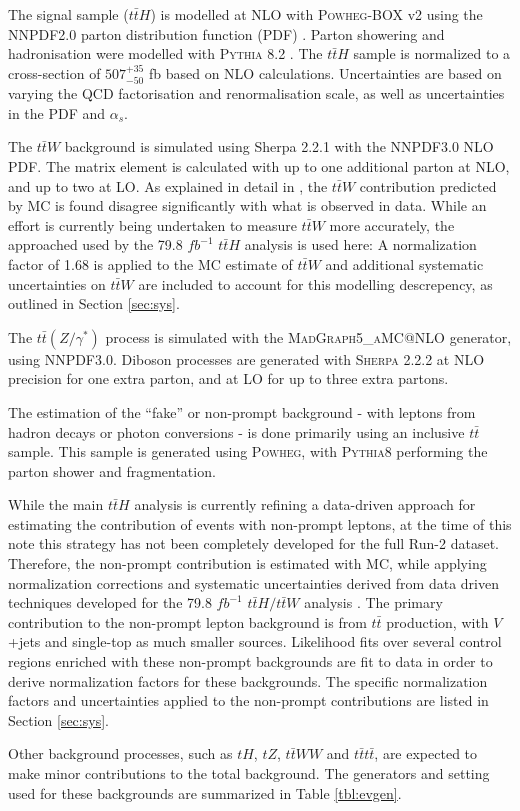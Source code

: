 The signal sample ($t\bar{t}H$) is modelled at NLO with \textsc{Powheg-BOX} v2 using the NNPDF2.0 parton distribution function (PDF) \cite{ATL-PHYS-PUB-2015-011}. Parton showering and hadronisation were modelled with \textsc{Pythia} 8.2 \cite{ATL-PHYS-PUB-2011-009}. The $t\bar{t}H$ sample is normalized to a cross-section of $507^{+35}_{-50}$ fb based on NLO calculations. Uncertainties are based on varying the QCD factorisation and renormalisation scale, as well as uncertainties in the PDF and $\alpha_s$.

The $t\bar{t}W$ background is simulated using Sherpa 2.2.1 with the NNPDF3.0 NLO PDF. The matrix element is calculated with up to one additional parton at NLO, and up to two at LO. As explained in detail in \cite{ttH_paper}, the $t\bar{t}W$ contribution predicted by MC is found disagree significantly with what is observed in data. While an effort is currently being undertaken to measure $t\bar{t}W$ more accurately, the approached used by the 79.8 $fb^{-1}$ $t\bar{t}H$ analysis is used here: A normalization factor of 1.68 is applied to the MC estimate of $t\bar{t}W$ and additional systematic uncertainties on $t\bar{t}W$ are included to account for this modelling descrepency, as outlined in Section \ref{sec:sys}.

The $t\bar{t}(Z/\gamma^*)$ process is simulated with the \textsc{MadGraph5\_aMC@NLO} generator, using NNPDF3.0. Diboson processes are generated with \textsc{Sherpa} 2.2.2 at NLO precision for one extra parton, and at LO for up to three extra partons.

The estimation of the ``fake'' or non-prompt background - with leptons from hadron decays or photon conversions - is done primarily using an inclusive $t\bar{t}$ sample. This sample is generated using \textsc{Powheg}, with \textsc{Pythia8} performing the parton shower and fragmentation. 

While the main $t\bar{t}H$ analysis is currently refining a data-driven approach for estimating the contribution of events with non-prompt leptons, at the time of this note this strategy has not been completely developed for the full Run-2 dataset. Therefore, the non-prompt contribution is estimated with MC, while applying normalization corrections and systematic uncertainties derived from data driven techniques developed for the 79.8 $fb^{-1}$ $t\bar{t}H/t\bar{t}W$ analysis \cite{ttH_paper}. The primary contribution to the non-prompt lepton background is from $t\bar{t}$ production, with $V$+jets and single-top as much smaller sources. Likelihood fits over several control regions enriched with these non-prompt backgrounds are fit to data in order to derive normalization factors for these backgrounds. The specific normalization factors and uncertainties applied to the non-prompt contributions are listed in Section \ref{sec:sys}.

Other background processes, such as $tH$, $tZ$, $t\bar{t}WW$ and $t\bar{t}t\bar{t}$, are expected to make minor contributions to the total background. The generators and setting used for these backgrounds are summarized in Table \ref{tbl:evgen}.

